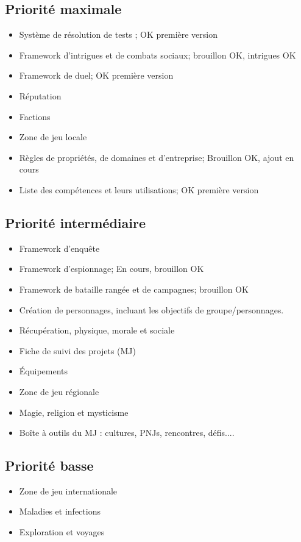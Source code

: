 \documentclass[10pt,a4paper]{book}
\begin{document}
\subsection*{Priorité maximale}
\begin{itemize}
\item Système de résolution de tests ; OK première version
\item Framework d'intrigues et de combats sociaux; brouillon OK, intrigues OK
\item Framework de duel; OK première version
\item Réputation
\item Factions
\item Zone de jeu locale
\item Règles de propriétés, de domaines et d'entreprise; Brouillon OK, ajout en cours
\item Liste des compétences et leurs utilisations; OK première version
\end{itemize}
\subsection*{Priorité intermédiaire}
\begin{itemize}
\item Framework d'enquête
\item Framework d'espionnage; En cours, brouillon OK
\item Framework de bataille rangée et de campagnes; brouillon OK
\item Création de personnages, incluant les objectifs de groupe/personnages.
\item Récupération, physique, morale et sociale
\item Fiche de suivi des projets (MJ)
\item Équipements
\item Zone de jeu régionale
\item Magie, religion et mysticisme
\item Boîte à outils du MJ : cultures, PNJs, rencontres, défis....
\end{itemize}
\subsection*{Priorité basse}
\begin{itemize}
\item Zone de jeu internationale
\item Maladies et infections
\item Exploration et voyages
\end{itemize}
\end{document}

